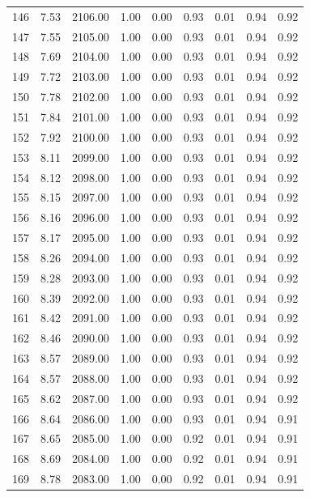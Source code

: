 \documentclass{article}\usepackage[]{graphicx}\usepackage[]{color}
\begin{document}
\begin{longtable}{rrrrrrrrr}
  146 & 7.53 & 2106.00 & 1.00 & 0.00 & 0.93 & 0.01 & 0.94 & 0.92 \\ 
  147 & 7.55 & 2105.00 & 1.00 & 0.00 & 0.93 & 0.01 & 0.94 & 0.92 \\ 
  148 & 7.69 & 2104.00 & 1.00 & 0.00 & 0.93 & 0.01 & 0.94 & 0.92 \\ 
  149 & 7.72 & 2103.00 & 1.00 & 0.00 & 0.93 & 0.01 & 0.94 & 0.92 \\ 
  150 & 7.78 & 2102.00 & 1.00 & 0.00 & 0.93 & 0.01 & 0.94 & 0.92 \\ 
  151 & 7.84 & 2101.00 & 1.00 & 0.00 & 0.93 & 0.01 & 0.94 & 0.92 \\ 
  152 & 7.92 & 2100.00 & 1.00 & 0.00 & 0.93 & 0.01 & 0.94 & 0.92 \\ 
  153 & 8.11 & 2099.00 & 1.00 & 0.00 & 0.93 & 0.01 & 0.94 & 0.92 \\ 
  154 & 8.12 & 2098.00 & 1.00 & 0.00 & 0.93 & 0.01 & 0.94 & 0.92 \\ 
  155 & 8.15 & 2097.00 & 1.00 & 0.00 & 0.93 & 0.01 & 0.94 & 0.92 \\ 
  156 & 8.16 & 2096.00 & 1.00 & 0.00 & 0.93 & 0.01 & 0.94 & 0.92 \\ 
  157 & 8.17 & 2095.00 & 1.00 & 0.00 & 0.93 & 0.01 & 0.94 & 0.92 \\ 
  158 & 8.26 & 2094.00 & 1.00 & 0.00 & 0.93 & 0.01 & 0.94 & 0.92 \\ 
  159 & 8.28 & 2093.00 & 1.00 & 0.00 & 0.93 & 0.01 & 0.94 & 0.92 \\ 
  160 & 8.39 & 2092.00 & 1.00 & 0.00 & 0.93 & 0.01 & 0.94 & 0.92 \\ 
  161 & 8.42 & 2091.00 & 1.00 & 0.00 & 0.93 & 0.01 & 0.94 & 0.92 \\ 
  162 & 8.46 & 2090.00 & 1.00 & 0.00 & 0.93 & 0.01 & 0.94 & 0.92 \\ 
  163 & 8.57 & 2089.00 & 1.00 & 0.00 & 0.93 & 0.01 & 0.94 & 0.92 \\ 
  164 & 8.57 & 2088.00 & 1.00 & 0.00 & 0.93 & 0.01 & 0.94 & 0.92 \\ 
  165 & 8.62 & 2087.00 & 1.00 & 0.00 & 0.93 & 0.01 & 0.94 & 0.92 \\ 
  166 & 8.64 & 2086.00 & 1.00 & 0.00 & 0.93 & 0.01 & 0.94 & 0.91 \\ 
  167 & 8.65 & 2085.00 & 1.00 & 0.00 & 0.92 & 0.01 & 0.94 & 0.91 \\ 
  168 & 8.69 & 2084.00 & 1.00 & 0.00 & 0.92 & 0.01 & 0.94 & 0.91 \\ 
  169 & 8.78 & 2083.00 & 1.00 & 0.00 & 0.92 & 0.01 & 0.94 & 0.91 \\ 

\end{longtable}
\end{document}
